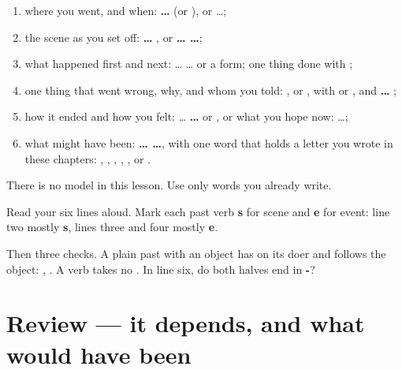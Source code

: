 \begin{enumerate}
\raggedright
  \item where you went, and when: \textbf{  … } (or \textbf{}), or \textbf{ } …;
  \item the scene as you set off: \textbf{…  }, or \textbf{ …  …};
  \item what happened first and next: \textbf{} … \textbf{} … or a \textbf{} form; one thing done with \textbf{};
  \item one thing that went wrong, why, and whom you told: \textbf{ }, \textbf{ } or \textbf{}, with \textbf{} or \textbf{  }, and \textbf{…  };
  \item how it ended and how you felt: \textbf{ } … \textbf{ … } or \textbf{  }, or what you hope now: \textbf{   } …;
  \item what might have been: \textbf{ …   …}, with one word that holds a letter you wrote in these chapters: , , , , ,  or .
\end{enumerate}

There is no model in this lesson. Use only words you already write.

\begin{tcolorbox}[breakable,colback=teal!4,colframe=teal!35!black,title={Before you move on}]
Read your six lines aloud. Mark each past verb \textbf{s} for scene and \textbf{e} for event: line two mostly \textbf{s}, lines three and four mostly \textbf{e}.

Then three checks. A plain past with an object has \textbf{} on its doer and follows the object: \textbf{   }, \textbf{   }. A \textbf{ } verb takes no \textbf{}. In line six, do both halves end in \textbf{-}?
\end{tcolorbox}
\section[(review)]{Review — it depends, and what would have been}

\label{lesson:UR-R275-depends-and-would}



